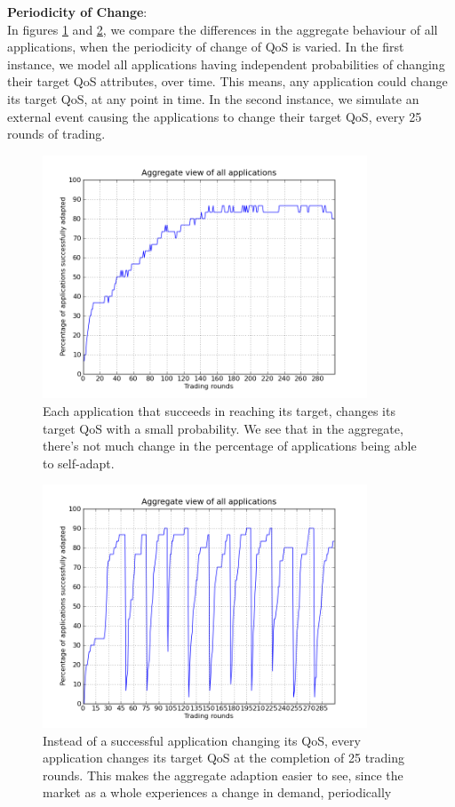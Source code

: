 \documentclass[10pt,journal,compsoc]{IEEEtran}
\begin{document}
\textbf{Periodicity of Change}:\\
 In figures \ref{QoS_Change1} and \ref{QoS_Change2}, we compare the differences in the aggregate behaviour of all applications, when the periodicity of change of QoS is varied. In the first instance, we model all applications having independent probabilities of changing their target QoS attributes, over time. This means, any application could change its target QoS, at any point in time. In the second instance, we simulate an external event causing the applications to change their target QoS, every 25 rounds of trading.
       \begin{figure}
	 \includegraphics[width=3.8in]{graphs/probabilistic-change-to-qa.png}
	 \caption{Each application that succeeds in reaching its target, changes its target QoS with a small probability. We see that in the aggregate, there's not much change in the percentage of applications being able to self-adapt.}
	 \label{QoS_Change1}
       \end{figure}
	 \begin{figure}
	 \includegraphics[width=3.8in]{graphs/periodic-change-to-qa.png}
	  \caption{Instead of a successful application changing its QoS, every application changes its target QoS at the completion of 25 trading rounds. This makes the aggregate adaption easier to see, since the market as a whole experiences a change in demand, periodically} 
	 \label{QoS_Change2}
	 \end{figure} %
     	
\end{document}

